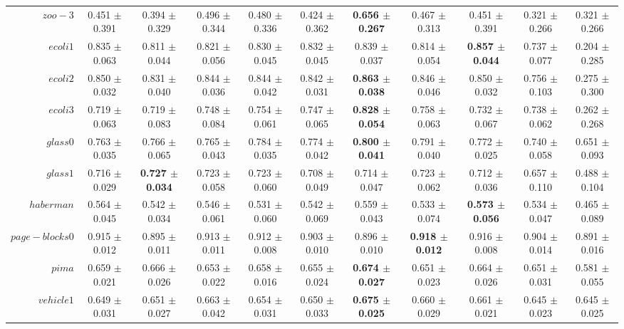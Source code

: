\begin{table}[!ht]
{\begin{tabular}{r c c c c c c c c c c}
$zoo-3$ & 0.451 $\pm$ 0.391 & 0.394 $\pm$ 0.329 & 0.496 $\pm$ 0.344 & 0.480 $\pm$ 0.336 & 0.424 $\pm$ 0.362 & \textbf{0.656 $\pm$ 0.267} & 0.467 $\pm$ 0.313 & 0.451 $\pm$ 0.391 & 0.321 $\pm$ 0.266 & 0.321 $\pm$ 0.266 \\
$ecoli1$ & 0.835 $\pm$ 0.063 & 0.811 $\pm$ 0.044 & 0.821 $\pm$ 0.056 & 0.830 $\pm$ 0.045 & 0.832 $\pm$ 0.045 & 0.839 $\pm$ 0.037 & 0.814 $\pm$ 0.054 & \textbf{0.857 $\pm$ 0.044} & 0.737 $\pm$ 0.077 & 0.204 $\pm$ 0.285 \\
$ecoli2$ & 0.850 $\pm$ 0.032 & 0.831 $\pm$ 0.040 & 0.844 $\pm$ 0.036 & 0.844 $\pm$ 0.042 & 0.842 $\pm$ 0.031 & \textbf{0.863 $\pm$ 0.038} & 0.846 $\pm$ 0.046 & 0.850 $\pm$ 0.032 & 0.756 $\pm$ 0.103 & 0.275 $\pm$ 0.300 \\
$ecoli3$ & 0.719 $\pm$ 0.063 & 0.719 $\pm$ 0.083 & 0.748 $\pm$ 0.084 & 0.754 $\pm$ 0.061 & 0.747 $\pm$ 0.065 & \textbf{0.828 $\pm$ 0.054} & 0.758 $\pm$ 0.063 & 0.732 $\pm$ 0.067 & 0.738 $\pm$ 0.062 & 0.262 $\pm$ 0.268 \\
$glass0$ & 0.763 $\pm$ 0.035 & 0.766 $\pm$ 0.065 & 0.765 $\pm$ 0.043 & 0.784 $\pm$ 0.035 & 0.774 $\pm$ 0.042 & \textbf{0.800 $\pm$ 0.041} & 0.791 $\pm$ 0.040 & 0.772 $\pm$ 0.025 & 0.740 $\pm$ 0.058 & 0.651 $\pm$ 0.093 \\
$glass1$ & 0.716 $\pm$ 0.029 & \textbf{0.727 $\pm$ 0.034} & 0.723 $\pm$ 0.058 & 0.723 $\pm$ 0.060 & 0.708 $\pm$ 0.049 & 0.714 $\pm$ 0.047 & 0.723 $\pm$ 0.062 & 0.712 $\pm$ 0.036 & 0.657 $\pm$ 0.110 & 0.488 $\pm$ 0.104 \\
$haberman$ & 0.564 $\pm$ 0.045 & 0.542 $\pm$ 0.034 & 0.546 $\pm$ 0.061 & 0.531 $\pm$ 0.060 & 0.542 $\pm$ 0.069 & 0.559 $\pm$ 0.043 & 0.533 $\pm$ 0.074 & \textbf{0.573 $\pm$ 0.056} & 0.534 $\pm$ 0.047 & 0.465 $\pm$ 0.089 \\
$page-blocks0$ & 0.915 $\pm$ 0.012 & 0.895 $\pm$ 0.011 & 0.913 $\pm$ 0.011 & 0.912 $\pm$ 0.008 & 0.903 $\pm$ 0.010 & 0.896 $\pm$ 0.010 & \textbf{0.918 $\pm$ 0.012} & 0.916 $\pm$ 0.008 & 0.904 $\pm$ 0.014 & 0.891 $\pm$ 0.016 \\
$pima$ & 0.659 $\pm$ 0.021 & 0.666 $\pm$ 0.026 & 0.653 $\pm$ 0.022 & 0.658 $\pm$ 0.016 & 0.655 $\pm$ 0.024 & \textbf{0.674 $\pm$ 0.027} & 0.651 $\pm$ 0.023 & 0.664 $\pm$ 0.026 & 0.651 $\pm$ 0.031 & 0.581 $\pm$ 0.055 \\
$vehicle1$ & 0.649 $\pm$ 0.031 & 0.651 $\pm$ 0.027 & 0.663 $\pm$ 0.042 & 0.654 $\pm$ 0.031 & 0.650 $\pm$ 0.033 & \textbf{0.675 $\pm$ 0.025} & 0.660 $\pm$ 0.029 & 0.661 $\pm$ 0.021 & 0.645 $\pm$ 0.023 & 0.645 $\pm$ 0.025 \\

\end{tabular}}
\end{table}
